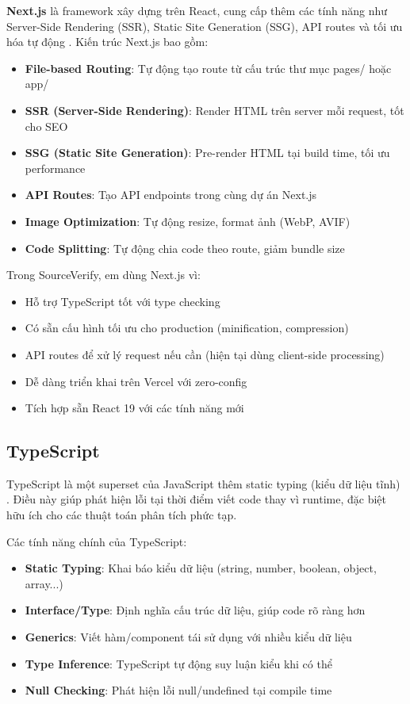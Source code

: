 \documentclass[14pt,a4paper,oneside]{report}
\begin{document}
\textbf{Next.js} là framework xây dựng trên React, cung cấp thêm các tính năng như Server-Side Rendering (SSR), Static Site Generation (SSG), API routes và tối ưu hóa tự động \cite{nextjs}. Kiến trúc Next.js bao gồm:

\begin{itemize}
  \item \textbf{File-based Routing}: Tự động tạo route từ cấu trúc thư mục pages/ hoặc app/
  \item \textbf{SSR (Server-Side Rendering)}: Render HTML trên server mỗi request, tốt cho SEO
  \item \textbf{SSG (Static Site Generation)}: Pre-render HTML tại build time, tối ưu performance
  \item \textbf{API Routes}: Tạo API endpoints trong cùng dự án Next.js
  \item \textbf{Image Optimization}: Tự động resize, format ảnh (WebP, AVIF)
  \item \textbf{Code Splitting}: Tự động chia code theo route, giảm bundle size
\end{itemize}

Trong SourceVerify, em dùng Next.js vì:
\begin{itemize}
  \item Hỗ trợ TypeScript tốt với type checking
  \item Có sẵn cấu hình tối ưu cho production (minification, compression)
  \item API routes để xử lý request nếu cần (hiện tại dùng client-side processing)
  \item Dễ dàng triển khai trên Vercel với zero-config
  \item Tích hợp sẵn React 19 với các tính năng mới
\end{itemize}

\subsection{TypeScript}
TypeScript là một superset của JavaScript thêm static typing (kiểu dữ liệu tĩnh) \cite{typescript}. Điều này giúp phát hiện lỗi tại thời điểm viết code thay vì runtime, đặc biệt hữu ích cho các thuật toán phân tích phức tạp.

Các tính năng chính của TypeScript:
\begin{itemize}
  \item \textbf{Static Typing}: Khai báo kiểu dữ liệu (string, number, boolean, object, array...)
  \item \textbf{Interface/Type}: Định nghĩa cấu trúc dữ liệu, giúp code rõ ràng hơn
  \item \textbf{Generics}: Viết hàm/component tái sử dụng với nhiều kiểu dữ liệu
  \item \textbf{Type Inference}: TypeScript tự động suy luận kiểu khi có thể
  \item \textbf{Null Checking}: Phát hiện lỗi null/undefined tại compile time
\end{itemize}
\end{document}
